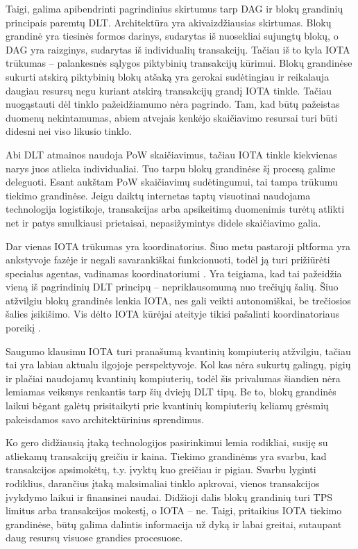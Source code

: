 Taigi, galima apibendrinti pagrindinius skirtumus tarp DAG ir blokų grandinių principais paremtų DLT. Architektūra yra akivaizdžiausias skirtumas. Blokų grandinė yra tiesinės formos darinys, sudarytas iš nuosekliai sujungtų blokų, o DAG yra raizginys, sudarytas iš individualių transakcijų. Tačiau iš to kyla IOTA trūkumas – palankesnės sąlygos piktybinių transakcijų kūrimui. Blokų grandinėse sukurti atskirą piktybinių blokų atšaką yra gerokai sudėtingiau ir reikalauja daugiau resursų negu kuriant atskirą transakcijų grandį IOTA tinkle. Tačiau nuogąstauti dėl tinklo pažeidžiamumo nėra pagrindo. Tam, kad būtų pažeistas duomenų nekintamumas, abiem atvejais kenkėjo skaičiavimo resursai turi būti didesni nei viso likusio tinklo.

Abi DLT atmainos naudoja PoW skaičiavimus, tačiau IOTA tinkle kiekvienas narys juos atlieka individualiai. Tuo tarpu blokų grandinėse šį procesą galime deleguoti. Esant aukštam PoW skaičiavimų sudėtingumui, tai tampa trūkumu tiekimo grandinėse. Jeigu daiktų internetas taptų visuotinai naudojama technologija logistikoje, transakcijas arba apsikeitimą duomenimis turėtų atlikti net ir patys smulkiausi prietaisai, nepasižymintys didele skaičiavimo galia.

Dar vienas IOTA trūkumas yra koordinatorius. Šiuo metu pastaroji pltforma yra ankstyvoje fazėje ir negali savarankiškai funkcionuoti, todėl ją turi prižiūrėti specialus agentas, vadinamas koordinatoriumi \cite{bramas2018stability}. Yra teigiama, kad tai pažeidžia vieną iš pagrindinių DLT principų – nepriklausomumą nuo trečiųjų šalių. Šiuo atžvilgiu blokų grandinės lenkia IOTA, nes gali veikti autonomiškai, be trečiosios šalies įsikišimo. Vis dėlto IOTA kūrėjai ateityje tikisi pašalinti koordinatoriaus poreikį \cite{bramas2018stability}.

Saugumo klausimu IOTA turi pranašumą kvantinių kompiuterių atžvilgiu, tačiau tai yra labiau aktualu ilgojoje perspektyvoje. Kol kas nėra sukurtų galingų, pigių ir plačiai naudojamų kvantinių kompiuterių, todėl šis privalumas šiandien nėra lemiamas veiksnys renkantis tarp šių dviejų DLT tipų. Be to, blokų grandinės laikui bėgant galėtų prisitaikyti prie kvantinių kompiuterių keliamų grėsmių pakeisdamos savo architektūrinius sprendimus.

Ko gero didžiausią įtaką technologijos pasirinkimui lemia rodikliai, susiję su atliekamų transakcijų greičiu ir kaina. Tiekimo grandinėms yra svarbu, kad transakcijos apsimokėtų, t.y. įvyktų kuo greičiau ir pigiau. Svarbu lyginti rodiklius, darančius įtaką maksimaliai tinklo apkrovai, vienos transakcijos įvykdymo laikui ir finansinei naudai. Didžioji dalis blokų grandinių turi TPS limitus arba transakcijos mokestį, o IOTA – ne. Taigi, pritaikius IOTA tiekimo grandinėse, būtų galima dalintis informacija už dyką ir labai greitai, sutaupant daug resursų visuose grandies procesuose.


